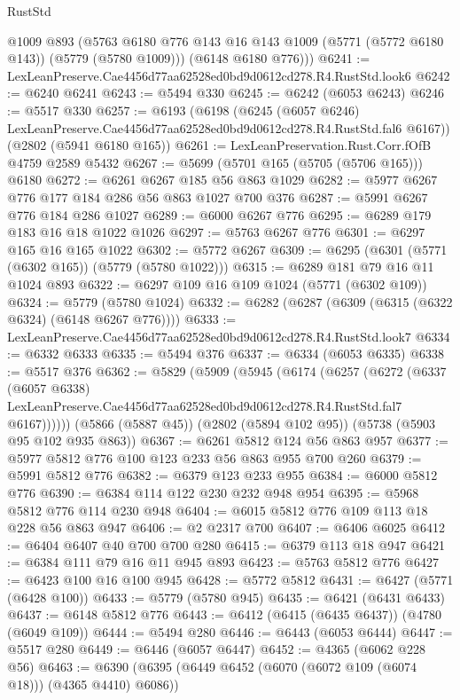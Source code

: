 \begin{lexlean}{RustStd}
\begin{coremodule}
        @1009
        @893
        (@5763 @6180 @776 @143 @16 @143 @1009 (@5771 (@5772 @6180 @143)) (@5779 (@5780 @1009)))
        (@6148 @6180 @776)))
@6241 := LexLeanPreserve.Cae4456d77aa62528ed0bd9d0612cd278.R4.RustStd.look6
@6242 := @6240 @6241
@6243 := @5494 @330
@6245 := @6242 (@6053 @6243)
@6246 := @5517 @330
@6257 := @6193
    (@6198
      (@6245 (@6057 @6246) LexLeanPreserve.Cae4456d77aa62528ed0bd9d0612cd278.R4.RustStd.fal6 @6167))
    (@2802 (@5941 @6180 @165))
@6261 := LexLeanPreservation.Rust.Corr.fOfB @4759 @2589 @5432
@6267 := @5699 (@5701 @165 (@5705 (@5706 @165))) @6180
@6272 := @6261 @6267 @185 @56 @863 @1029
@6282 := @5977 @6267 @776 @177 @184 @286 @56 @863 @1027 @700 @376
@6287 := @5991 @6267 @776 @184 @286 @1027
@6289 := @6000 @6267 @776
@6295 := @6289 @179 @183 @16 @18 @1022 @1026
@6297 := @5763 @6267 @776
@6301 := @6297 @165 @16 @165 @1022
@6302 := @5772 @6267
@6309 := @6295 (@6301 (@5771 (@6302 @165)) (@5779 (@5780 @1022)))
@6315 := @6289 @181 @79 @16 @11 @1024 @893
@6322 := @6297 @109 @16 @109 @1024 (@5771 (@6302 @109))
@6324 := @5779 (@5780 @1024)
@6332 := @6282 (@6287 (@6309 (@6315 (@6322 @6324) (@6148 @6267 @776))))
@6333 := LexLeanPreserve.Cae4456d77aa62528ed0bd9d0612cd278.R4.RustStd.look7
@6334 := @6332 @6333
@6335 := @5494 @376
@6337 := @6334 (@6053 @6335)
@6338 := @5517 @376
@6362 := @5829
    (@5909
      (@5945
        (@6174
          (@6257
            (@6272
              (@6337
                (@6057 @6338)
                LexLeanPreserve.Cae4456d77aa62528ed0bd9d0612cd278.R4.RustStd.fal7
                @6167))))))
    (@5866 (@5887 @45))
    (@2802 (@5894 @102 @95))
    (@5738 (@5903 @95 @102 @935 @863))
@6367 := @6261 @5812 @124 @56 @863 @957
@6377 := @5977 @5812 @776 @100 @123 @233 @56 @863 @955 @700 @260
@6379 := @5991 @5812 @776
@6382 := @6379 @123 @233 @955
@6384 := @6000 @5812 @776
@6390 := @6384 @114 @122 @230 @232 @948 @954
@6395 := @5968 @5812 @776 @114 @230 @948
@6404 := @6015 @5812 @776 @109 @113 @18 @228 @56 @863 @947
@6406 := @2 @2317 @700
@6407 := @6406 @6025
@6412 := @6404 @6407 @40 @700 @700 @280
@6415 := @6379 @113 @18 @947
@6421 := @6384 @111 @79 @16 @11 @945 @893
@6423 := @5763 @5812 @776
@6427 := @6423 @100 @16 @100 @945
@6428 := @5772 @5812
@6431 := @6427 (@5771 (@6428 @100))
@6433 := @5779 (@5780 @945)
@6435 := @6421 (@6431 @6433)
@6437 := @6148 @5812 @776
@6443 := @6412 (@6415 (@6435 @6437)) (@4780 (@6049 @109))
@6444 := @5494 @280
@6446 := @6443 (@6053 @6444)
@6447 := @5517 @280
@6449 := @6446 (@6057 @6447)
@6452 := @4365 (@6062 @228 @56)
@6463 := @6390 (@6395 (@6449 @6452 (@6070 (@6072 @109 (@6074 @18))) (@4365 @4410) @6086))

\end{coremodule}
\end{lexlean}
